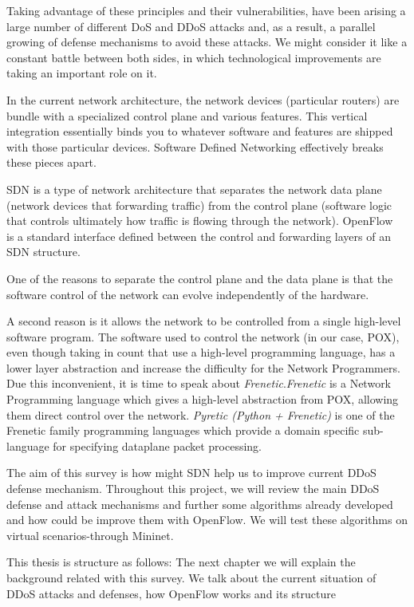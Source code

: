 \bigskip

Taking advantage of these principles and their vulnerabilities, have been arising a large number of different DoS and DDoS attacks and, as a result, a parallel growing of defense mechanisms to avoid these attacks. We might consider it like a constant battle between both sides, in which technological improvements are taking an important role on it. 
 
\par

In the current network architecture, the network devices (particular routers) are bundle with a specialized control plane and various features. This vertical integration essentially binds you to whatever software and features are shipped with those particular devices. Software Defined Networking effectively breaks these pieces apart.

\par

SDN is a type of network architecture that separates the network data plane (network devices that forwarding traffic) from the control plane (software logic that controls ultimately how traffic is flowing through the network). OpenFlow~\cite{OpenFlowWP} is a standard interface defined between the control and forwarding layers of an SDN structure. 

\par

One of the reasons to separate the control plane and the data plane is that the software control of the network can evolve independently of the hardware. 

\par

A second reason is it allows the network to be controlled from a single high-level software program. The software used to control the network (in our case, POX), even though taking in count that use a high-level programming language, has a lower layer abstraction and increase the difficulty for the Network Programmers. Due this inconvenient, it is time to speak about \textit{Frenetic}.\textit{Frenetic} is a Network Programming language which gives a high-level abstraction from POX, allowing them direct control over the network. \textit{Pyretic (Python + Frenetic)} is one of the Frenetic family programming languages which provide a domain specific sub-language for specifying dataplane packet processing.

\par

The aim of this survey is how might SDN help us to improve current DDoS defense mechanism. Throughout this project, we will review the main DDoS defense and attack mechanisms and further some algorithms already developed and how could be improve them with OpenFlow. We will test these algorithms on virtual scenarios-through Mininet.

\bigskip

This thesis is structure as follows: The next chapter we will explain the background related with this survey. We talk about the current situation of DDoS attacks and defenses, how OpenFlow works and its structure



